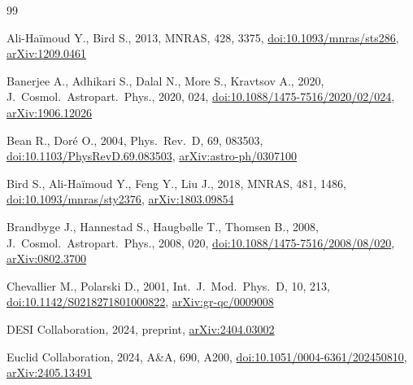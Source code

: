 \documentclass[fleqn,usenatbib]{mnras}
\begin{document}
\begin{thebibliography}{99}

Ali-Ha\"{i}moud Y., Bird S., 2013, MNRAS, 428, 3375,
\href{https://doi.org/10.1093/mnras/sts286}{doi:10.1093/mnras/sts286},
\href{https://arxiv.org/abs/1209.0461}{arXiv:1209.0461}

Banerjee A., Adhikari S., Dalal N., More S., Kravtsov A., 2020, J.\ Cosmol.\ Astropart.\ Phys., 2020, 024,
\href{https://doi.org/10.1088/1475-7516/2020/02/024}{doi:10.1088/1475-7516/2020/02/024},
\href{https://arxiv.org/abs/1906.12026}{arXiv:1906.12026}

Bean R., Dor{\'e} O., 2004, Phys.\ Rev.\ D, 69, 083503,
\href{https://doi.org/10.1103/PhysRevD.69.083503}{doi:10.1103/PhysRevD.69.083503},
\href{https://arxiv.org/abs/astro-ph/0307100}{arXiv:astro-ph/0307100}

Bird S., Ali-Ha\"{i}moud Y., Feng Y., Liu J., 2018, MNRAS, 481, 1486,
\href{https://doi.org/10.1093/mnras/sty2376}{doi:10.1093/mnras/sty2376},
\href{https://arxiv.org/abs/1803.09854}{arXiv:1803.09854}

Brandbyge J., Hannestad S., Haugb{\o}lle T., Thomsen B., 2008, J.\ Cosmol.\ Astropart.\ Phys., 2008, 020,
\href{https://doi.org/10.1088/1475-7516/2008/08/020}{doi:10.1088/1475-7516/2008/08/020},
\href{https://arxiv.org/abs/0802.3700}{arXiv:0802.3700}

Chevallier M., Polarski D., 2001, Int.\ J.\ Mod.\ Phys.\ D, 10, 213,
\href{https://doi.org/10.1142/S0218271801000822}{doi:10.1142/S0218271801000822},
\href{https://arxiv.org/abs/gr-qc/0009008}{arXiv:gr-qc/0009008}

DESI Collaboration, 2024, preprint,
\href{https://arxiv.org/abs/2404.03002}{arXiv:2404.03002}

Euclid Collaboration, 2024, A\&A, 690, A200,
\href{https://doi.org/10.1051/0004-6361/202450810}{doi:10.1051/0004-6361/202450810},
\href{https://arxiv.org/abs/2405.13491}{arXiv:2405.13491}


\end{thebibliography}
\end{document}

